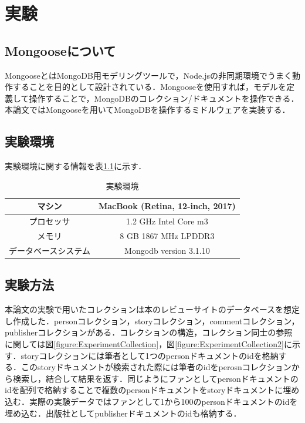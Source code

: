 \documentclass[a4paper,11pt]{ujreport}
\begin{document}
\chapter{実験}
\label{chap:Experiment}
\section{Mongooseについて}
MongooseとはMongoDB用モデリングツールで，Node.jsの非同期環境でうまく動作することを目的として設計されている．Mongooseを使用すれば，モデルを定義して操作することで，MongoDBのコレクション/ドキュメントを操作できる\cite{mongoose}．本論文ではMongooseを用いてMongoDBを操作するミドルウェアを実装する．

\section{実験環境}
実験環境に関する情報を表\ref{table:experiment_env}に示す．
\begin{table}[htb]
  \begin{center}
    \caption{実験環境}
		\label{table:experiment_env}
    \begin{tabular}{|c|c|} \hline
      マシン & MacBook (Retina, 12-inch, 2017) \\ \hline
      プロセッサ & 1.2 GHz Intel Core m3\\ \hline
      メモリ & 8 GB 1867 MHz LPDDR3\\ \hline
      データベースシステム & Mongodb version 3.1.10\\ \hline
    \end{tabular}
  \end{center}
\end{table}

\section{実験方法}
本論文の実験で用いたコレクションは本のレビューサイトのデータベースを想定し作成した．personコレクション，storyコレクション，commentコレクション，publisherコレクションがある．コレクションの構造，コレクション同士の参照に関しては図\ref{figure:ExperimentCollection}，図\ref{figure:ExperimentCollection2}に示す．storyコレクションには筆者として1つのpersonドキュメントのidを格納する．このstoryドキュメントが検索された際には筆者のidをperosnコレクションから検索し，結合して結果を返す．同じようにファンとしてpersonドキュメントのidを配列で格納することで複数のpersonドキュメントをstoryドキュメントに埋め込む．実際の実験データではファンとして1から100のpersonドキュメントのidを埋め込む．出版社としてpublisherドキュメントのidも格納する．
\end{document}
